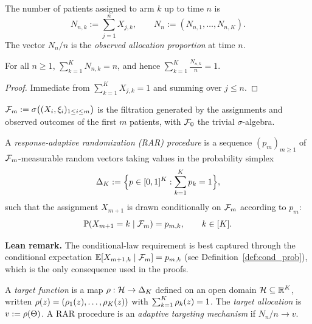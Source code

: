 \begin{definition}\label{def:counts}
\leanok
{}
The number of patients assigned to arm $k$ up to time $n$ is
\[
  N_{n,k} := \sum_{j=1}^n X_{j,k}, \qquad N_n := (N_{n,1}, \dots, N_{n,K}).
\]
The vector $N_n / n$ is the \emph{observed allocation proportion} at time $n$.
\end{definition}

\begin{lemma}\label{lem:counts_sum}
\leanok
{}
For all $n \ge 1$, $\sum_{k=1}^K N_{n,k} = n$, and hence
$\sum_{k=1}^K \frac{N_{n,k}}{n} = 1$.
\end{lemma}

\begin{proof}\leanok
{}
Immediate from $\sum_{k=1}^K X_{j,k} = 1$ and summing over $j \le n$.
\end{proof}

\begin{definition}[Filtration]\label{def:filtration}
\leanok
{}
$\mathcal{F}_m := \sigma\big((X_i, \xi_i)_{1 \le i \le m}\big)$ is the filtration
generated by the assignments and observed outcomes of the first $m$ patients,
with $\mathcal{F}_0$ the trivial $\sigma$-algebra.
\end{definition}

\begin{definition}\label{def:rar}
A \emph{response-adaptive randomization (RAR) procedure} is a sequence
$(p_m)_{m \ge 1}$ of $\mathcal{F}_m$-measurable random vectors taking values in the
probability simplex
\[
  \Delta_K := \Big\{ p \in [0,1]^K : \sum_{k=1}^K p_k = 1 \Big\},
\]
such that the assignment $X_{m+1}$ is drawn conditionally on $\mathcal{F}_m$ according
to $p_m$:
\[
  \mathbb{P}(X_{m+1} = k \mid \mathcal{F}_m) = p_{m,k}, \qquad k \in [K].
\]
\end{definition}

\textbf{Lean remark.} The conditional-law requirement is best captured through
the conditional expectation $\mathbb{E}[X_{m+1,k} \mid \mathcal{F}_m] = p_{m,k}$
(see Definition~\ref{def:cond_prob}), which is the only consequence used in the proofs.

\begin{definition}\label{def:target}
A \emph{target function} is a map $\rho : \mathcal{H} \to \Delta_K$ defined on an
open domain $\mathcal{H} \subseteq \mathbb{R}^K$, written
$\rho(z) = (\rho_1(z), \dots, \rho_K(z))$ with
$\sum_{k=1}^K \rho_k(z) = 1$. The \emph{target allocation} is
$v := \rho(\Theta)$. A RAR procedure is an \emph{adaptive targeting
mechanism} if $N_n/n \to v$.
\end{definition}

